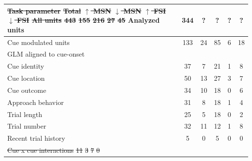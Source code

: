 \documentclass[11pt]{article}
\providecommand{\DIFdel}[1]{{\protect\color{red}\sout{#1}}}                      %
\providecommand{\DIFdelFL}[1]{\DIFdel{#1}} %
\providecommand{\DIFdelbeginFL}{} %
\providecommand{\DIFdelendFL}{} %
\newcommand{\DIFscaledelfig}{0.5}
\newlength{\DIFdelgraphicswidth} %
\newlength{\DIFdelgraphicsheight} %
\newcommand{\DIFdelincludegraphics}[2][]{%
\sbox{\DIFdelgraphicsbox}{\DIFOincludegraphics[#1]{#2}}%
\settoboxwidth{\DIFdelgraphicswidth}{\DIFdelgraphicsbox} %
\settoboxtotalheight{\DIFdelgraphicsheight}{\DIFdelgraphicsbox} %
\scalebox{\DIFscaledelfig}{%
\parbox[b]{\DIFdelgraphicswidth}{\usebox{\DIFdelgraphicsbox}\\[-\baselineskip] \rule{\DIFdelgraphicswidth}{0em}}\llap{\resizebox{\DIFdelgraphicswidth}{\DIFdelgraphicsheight}{%
\setlength{\unitlength}{\DIFdelgraphicswidth}%
\begin{picture}(1,1)%
\thicklines\linethickness{2pt} %
{\color[rgb]{1,0,0}\put(0,0){\framebox(1,1){}}}%
{\color[rgb]{1,0,0}\put(0,0){\line( 1,1){1}}}%
{\color[rgb]{1,0,0}\put(0,1){\line(1,-1){1}}}%
\end{picture}%
}\hspace*{3pt}}} %
} %
\DeclareRobustCommand{\DIFdelbeginFL}{\DIFOdelbeginFL \let\includegraphics\DIFdelincludegraphics} %
\DeclareRobustCommand{\DIFdelendFL}{\DIFOaddendFL \let\includegraphics\DIFOincludegraphics} %
\begin{document}
{\begin{table}
\begin{tabular}{l c  c c c c}

\DIFdelFL{Task parameter                                 }%
\DIFdelFL{Total        }%
\DIFdelFL{$\uparrow$ MSN        }%
\DIFdelFL{$\downarrow$ MSN        }%
\DIFdelFL{$\uparrow$ FSI       }%
\DIFdelFL{$\downarrow$ FSI}%
\DIFdelFL{All units                       }%
\DIFdelFL{443        }%
\DIFdelFL{155         }%
\DIFdelFL{216          }%
\DIFdelFL{27          }%
\DIFdelFL{45}%
\DIFdelendFL Analyzed units                       & 344        & ?         & ?         & ?          & ?\\
\hline
Cue modulated units                      & 133         &24          &85          & 6          &18\\
\hline
GLM aligned to cue-onset                       &         &       &          &          &\\
\hline
Cue identity       & 37         & 7          & 21          & 1          & 8\\
\hline
Cue location       & 50         &13          & 27          & 3          & 7\\
\hline
Cue outcome       & 34         & 10          & 18        & 0          & 6\\
\hline
Approach behavior      & 31         & 8          & 18          & 1          & 4\\
\hline
Trial length       & 25        & 5          & 18         & 0         & 2\\
\hline
Trial number       & 32         & 11          & 12         & 1          & 8\\
\hline
Recent trial history       & 5         & 0          &5          & 0          & 0\\
\hline
\DIFdelbeginFL \DIFdelFL{Cue x cue interactions       }%
\DIFdelFL{11         }%
\DIFdelFL{3          }%
\DIFdelFL{7          }%
\DIFdelFL{0          }%

\end{tabular}
\end{table}}
\end{document}

